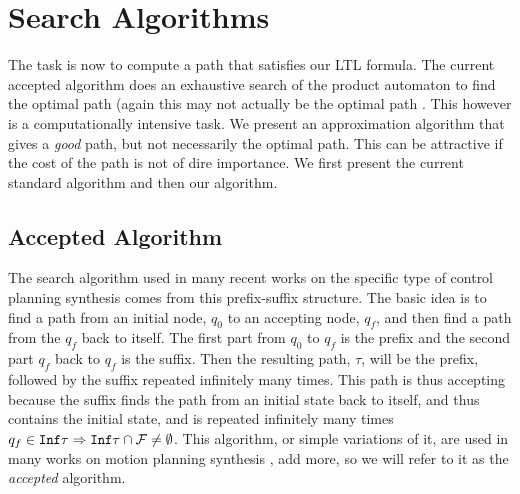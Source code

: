 \chapter{Search Algorithms}
The task is now to compute a path that satisfies our LTL formula. The current accepted algorithm does an exhaustive search of the product automaton to find the optimal path (again this may not actually be the optimal path \cite{schuppan05}. This however is a computationally intensive task. We present an approximation algorithm that gives a \textit{good} path, but not necessarily the optimal path. This can be attractive if the cost of the path is not of dire importance. We first present the current standard algorithm and then our algorithm. 
\section{Accepted Algorithm}
The search algorithm used in many recent works on the specific type of control planning synthesis comes from this prefix-suffix structure. The basic idea is to find a path from an initial node, $q_0$ to an accepting node, $q_f$, and then find a path from the $q_f$ back to itself. The first part from $q_0$ to $q_f$ is the prefix and the second part $q_f$ back to $q_f$ is the suffix. Then the resulting path, $\tau$, will be the prefix, followed by the suffix repeated infinitely many times. This path is thus accepting because the suffix finds the path from an initial state back to itself, and thus contains the initial state, and is repeated infinitely many times $q_f \in \texttt{Inf} \tau  \Rightarrow \texttt{Inf} \tau \cap \mathcal{F} \neq \emptyset$. This algorithm, or simple variations of it, are used in many works on motion planning synthesis \cite{fainekos09}, add more, so we will refer to it as the \textit{accepted} algorithm. 


